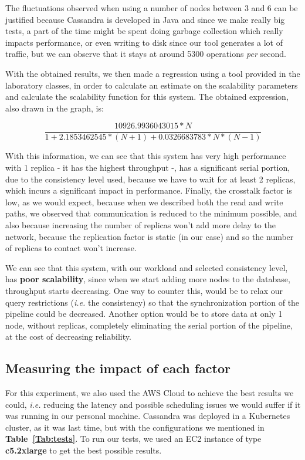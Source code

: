 \documentclass[runningheads]{llncs}
\begin{document}
The fluctuations observed when using a number of nodes between 3 and 6 can be justified because Cassandra is developed in Java and since we make really big tests, a part of the time might be spent doing garbage collection which really impacts performance, or even writing to disk since our tool generates a lot of traffic, but we can observe that it stays at around 5300 operations \textit{per} second. \par

With the obtained results, we then made a regression using a tool provided in the laboratory classes, in order to calculate an estimate on the scalability parameters and calculate the scalability function for this system. The obtained expression, also drawn in the graph, is:

\[ \frac{10926.9936043015 * N}{1 + 2.1853462545 * (N + 1) +  0.0326683783 * N * (N - 1)} \]

With this information, we can see that this system has very high performance with 1 replica - it has the highest throughput -, has a significant serial portion, due to the consistency level used, because we have to wait for at least 2 replicas, which incurs a significant impact in performance. Finally, the crosstalk factor is low, as we would expect, because when we described both the read and write paths, we observed that communication is reduced to the minimum possible, and also because increasing the number of replicas won't add more delay to the network, because the replication factor is static (in our case) and so the number of replicas to contact won't increase.\par

We can see that this system, with our workload and selected consistency level, has \textbf{poor scalability}, since when we start adding more nodes to the database, throughput starts decreasing. One way to counter this, would be to relax our query restrictions (\emph{i.e.} the consistency) so that the synchronization portion of the pipeline could be decreased. Another option would be to store data at only 1 node, without replicas, completely eliminating the serial portion of the pipeline, at the cost of decreasing reliability.

\subsection{Measuring the impact of each factor}

For this experiment, we also used the AWS Cloud to achieve the best results we could, \emph{i.e.} reducing the latency and possible scheduling issues we would suffer if it was running in our personal machine. Cassandra was deployed in a Kubernetes cluster, as it was last time, but with the configurations we mentioned in \textbf{Table~\ref{Tab:tests}}. To run our tests, we used an EC2 instance of type \textbf{c5.2xlarge} to get the best possible results.
\end{document}
